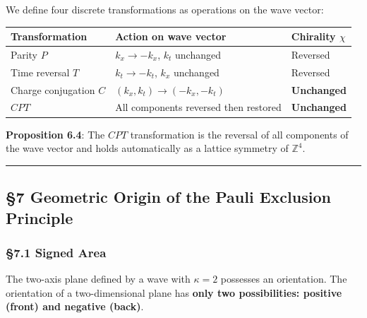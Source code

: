 \documentclass[
  a4paper,11pt]{article}
\newcounter{none}
\theoremstyle{definition}
\theoremstyle{remark}
\begin{document}
We define four discrete transformations as operations on the wave
vector:

{\def\LTcaptype{none} %
\begin{longtable}[]{@{}
  >{\raggedright\arraybackslash}p{}
  >{\raggedright\arraybackslash}p{}
  >{\raggedright\arraybackslash}p{}@{}}
\toprule\noalign{}
\begin{minipage}[b]{\linewidth}\raggedright
Transformation
\end{minipage} & \begin{minipage}[b]{\linewidth}\raggedright
Action on wave vector
\end{minipage} & \begin{minipage}[b]{\linewidth}\raggedright
Chirality \(\chi\)
\end{minipage} \\
\midrule\noalign{}
\endhead
\bottomrule\noalign{}
\endlastfoot
Parity \(P\) & \(k_x \to -k_x\), \(k_t\) unchanged & Reversed \\
Time reversal \(T\) & \(k_t \to -k_t\), \(k_x\) unchanged & Reversed \\
Charge conjugation \(C\) & \((k_x, k_t) \to (-k_x, -k_t)\) &
\textbf{Unchanged} \\
\(CPT\) & All components reversed then restored & \textbf{Unchanged} \\
\end{longtable}
}

\textbf{Proposition 6.4}: The \(CPT\) transformation is the reversal of
all components of the wave vector and holds automatically as a lattice
symmetry of \(\mathbb{Z}^4\).

\begin{center}\rule{0.5\linewidth}{0.5pt}\end{center}

\subsection{§7 Geometric Origin of the Pauli Exclusion
Principle}\label{geometric-origin-of-the-pauli-exclusion-principle}

\subsubsection{§7.1 Signed Area}\label{signed-area}

The two-axis plane defined by a wave with \(\kappa = 2\) possesses an
orientation. The orientation of a two-dimensional plane has \textbf{only
two possibilities: positive (front) and negative (back)}.
\end{document}
